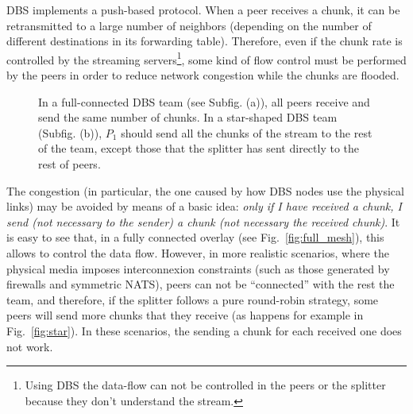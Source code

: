 

\label{sec:chunk_flooding}

\begin{comment}
\begin{figure*}
  \imgw{300}{graphics/peer_chunk_flooding.svg}
  \caption{Chunk flooding at peers.\label{fig:peer_chunk_flooding}}
\end{figure*}
\end{comment}

DBS implements a push-based protocol. When a peer receives a chunk, it
can be retransmitted to a large number of neighbors (depending on the
number of different destinations in its forwarding table). Therefore,
even if the chunk rate is controlled by the streaming
servers\footnote{Using DBS the data-flow can not be controlled in the
  peers or the splitter because they don't understand the stream.},
some kind of flow control must be performed by the peers in order to
reduce network congestion while the chunks are flooded.


\begin{figure*}
  \centering
  \quad
  \caption{In a full-connected DBS team (see Subfig. (a)), all peers
    receive and send the same number of chunks. In a star-shaped DBS
    team (Subfig. (b)), $P_1$ should send all the chunks of the stream
    to the rest of the team, except those that the splitter has sent
    directly to the rest of peers.}
\end{figure*}

The congestion (in particular, the one caused by how DBS nodes use the
physical links) may be avoided by means of a basic idea: \textit{only
  if I have received a chunk, I send (not necessary to the sender) a
  chunk (not necessary the received chunk)}. It is easy to see that,
in a fully connected overlay (see Fig.~\ref{fig:full_mesh}), this
allows to control the data flow. However, in more realistic scenarios,
where the physical media imposes interconnexion constraints (such as
those generated by firewalls and symmetric NATS), peers can not be
``connected'' with the rest the team, and therefore, if the splitter
follows a pure round-robin strategy, some peers will send more chunks
that they receive (as happens for example in Fig.~\ref{fig:star}). In
these scenarios, the sending a chunk for each received one does not
work.

